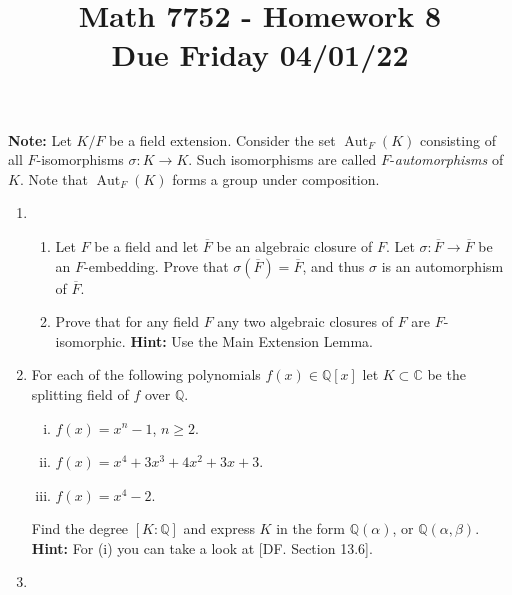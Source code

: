 \documentclass[12pt,
psamsfonts]{amsart}
\title{Math 7752 - Homework 8\\
Due Friday 04/01/22}
\theoremstyle{remark}
\theoremstyle{definition}
\newcommand{\N}{\mathbb{N}\xspace}
\newcommand{\Q}{\mathbb{Q}\xspace}
\newcommand{\C}{\mathbb{C}\xspace}
\DeclareMathOperator{\Aut}{Aut}
\numberwithin{equation}{section}
\begin{document}
\maketitle


\textbf{Note:} Let $K/F$ be a field extension. Consider the set $\Aut_F(K)$ consisting of all $F$-isomorphisms $\sigma:K\to K$. Such isomorphisms are called $F$-\textit{automorphisms} of $K$. Note that $\Aut_F(K)$ forms a group under composition. 
\\
\begin{enumerate}
\item  
\begin{enumerate}
\item Let $F$ be a field and let $\overline{F}$ be an algebraic closure of $F$. Let $\sigma:\overline{F}\to\overline{F}$ be an $F$-embedding. Prove that $\sigma(\overline{F})=\overline{F}$, and thus $\sigma$ is an automorphism of $\overline{F}$.  
\item Prove that for any field $F$ any two algebraic closures of $F$ are $F$-isomorphic. \textbf{Hint:} Use the Main Extension Lemma. 
\end{enumerate} 
\medskip 
\item For each of the following polynomials $f(x)\in\Q[x]$ let $K\subset \C$ be the splitting field of $f$ over $\Q$. 
 \begin{enumerate}
[(i)]\item $f(x)=x^n-1$, $n\geq 2$.
\item $f(x)=x^4+3x^3+4x^2+3x+3$.
\item  $f(x)=x^4-2$.
\end{enumerate} Find the degree $[K:\Q]$ and express $K$ in the form $\Q(\alpha)$, or $\Q(\alpha,\beta)$. \textbf{Hint:} For (i) you can take a look at [DF. Section 13.6].
\medskip
\item 
\begin{enumerate}

\end{enumerate}
\end{enumerate}
\end{document}
